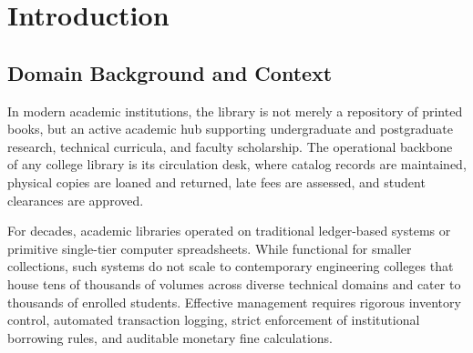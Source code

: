 \chapter{Introduction}

\section{Domain Background and Context}
In modern academic institutions, the library is not merely a repository of printed books, but an active academic hub supporting undergraduate and postgraduate research, technical curricula, and faculty scholarship. The operational backbone of any college library is its circulation desk, where catalog records are maintained, physical copies are loaned and returned, late fees are assessed, and student clearances are approved.

For decades, academic libraries operated on traditional ledger-based systems or primitive single-tier computer spreadsheets. While functional for smaller collections, such systems do not scale to contemporary engineering colleges that house tens of thousands of volumes across diverse technical domains and cater to thousands of enrolled students. Effective management requires rigorous inventory control, automated transaction logging, strict enforcement of institutional borrowing rules, and auditable monetary fine calculations.

